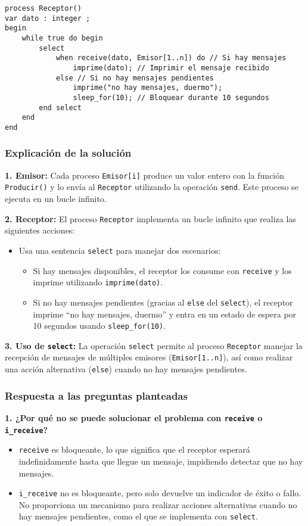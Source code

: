 \documentclass[a4paper,12pt]{article}
\begin{document}
\begin{lstlisting}[style=customcpp]
process Receptor()
var dato : integer ;
begin
    while true do begin
        select
            when receive(dato, Emisor[1..n]) do // Si hay mensajes
                imprime(dato); // Imprimir el mensaje recibido
            else // Si no hay mensajes pendientes
                imprime("no hay mensajes, duermo");
                sleep_for(10); // Bloquear durante 10 segundos
        end select
    end
end
\end{lstlisting}

\subsubsection*{\textbf{Explicación de la solución}}

\textbf{1. Emisor:}  
Cada proceso \texttt{Emisor[i]} produce un valor entero con la función \texttt{Producir()} y lo envía al \texttt{Receptor} utilizando la operación \texttt{send}. Este proceso se ejecuta en un bucle infinito.

\textbf{2. Receptor:}  
El proceso \texttt{Receptor} implementa un bucle infinito que realiza las siguientes acciones:
\begin{itemize}
  \item Usa una sentencia \texttt{select} para manejar dos escenarios:
  \begin{itemize}
    \item Si hay mensajes disponibles, el receptor los consume con \texttt{receive} y los imprime utilizando \texttt{imprime(dato)}.
    \item Si no hay mensajes pendientes (gracias al \texttt{else} del \texttt{select}), el receptor imprime ``no hay mensajes, duermo'' y entra en un estado de espera por 10 segundos usando \texttt{sleep\_for(10)}.
  \end{itemize}
\end{itemize}
\textbf{3. Uso de \texttt{select}:}  
La operación \texttt{select} permite al proceso \texttt{Receptor} manejar la recepción de mensajes de múltiples emisores (\texttt{Emisor[1..n]}), así como realizar una acción alternativa (\texttt{else}) cuando no hay mensajes pendientes.

\subsubsection*{\textbf{Respuesta a las preguntas planteadas}}

\textbf{1. ¿Por qué no se puede solucionar el problema con \texttt{receive} o \texttt{i\_receive}?}  
\begin{itemize}
  \item \texttt{receive} es bloqueante, lo que significa que el receptor esperará indefinidamente hasta que llegue un mensaje, impidiendo detectar que no hay mensajes.
  \item \texttt{i\_receive} no es bloqueante, pero solo devuelve un indicador de éxito o fallo. No proporciona un mecanismo para realizar acciones alternativas cuando no hay mensajes pendientes, como el que se implementa con \texttt{select}.
\end{itemize}
\end{document}

